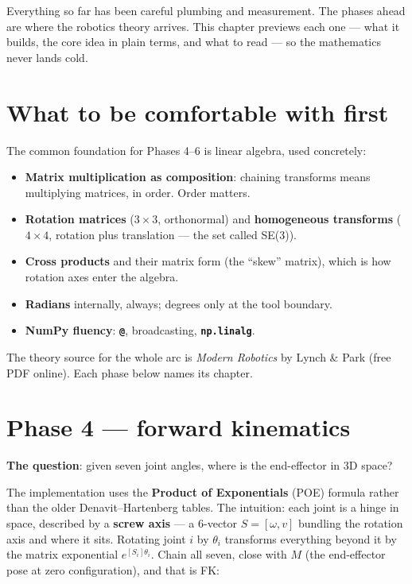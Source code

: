 \documentclass[11pt,twoside,openright]{book}
\newcommand{\code}[1]{\texttt{\bfseries #1}}
\begin{document}
Everything so far has been careful plumbing and measurement. The phases
ahead are where the robotics theory arrives. This chapter previews each
one --- what it builds, the core idea in plain terms, and what to read ---
so the mathematics never lands cold.

\section{What to be comfortable with first}

The common foundation for Phases 4--6 is linear algebra, used concretely:

\begin{itemize}
  \item \textbf{Matrix multiplication as composition}: chaining
    transforms means multiplying matrices, in order. Order matters.
  \item \textbf{Rotation matrices} ($3\times3$, orthonormal) and
    \textbf{homogeneous transforms} ($4\times4$, rotation plus
    translation --- the set called SE(3)).
  \item \textbf{Cross products} and their matrix form (the ``skew''
    matrix), which is how rotation axes enter the algebra.
  \item \textbf{Radians} internally, always; degrees only at the
    tool boundary.
  \item \textbf{NumPy fluency}: \code{@}, broadcasting,
    \code{np.linalg}.
\end{itemize}

The theory source for the whole arc is \textit{Modern Robotics} by Lynch
\& Park (free PDF online). Each phase below names its chapter.

\section{Phase 4 --- forward kinematics}

\textbf{The question}: given seven joint angles, where is the
end-effector in 3D space?

The implementation uses the \textbf{Product of Exponentials} (POE)
formula rather than the older Denavit--Hartenberg tables. The intuition:
each joint is a hinge in space, described by a \textbf{screw axis} --- a
6-vector $S = [\omega, v]$ bundling the rotation axis and where it sits.
Rotating joint $i$ by $\theta_i$ transforms everything beyond it by the
matrix exponential $e^{[S_i]\theta_i}$. Chain all seven, close with $M$
(the end-effector pose at zero configuration), and that is FK:
\end{document}
